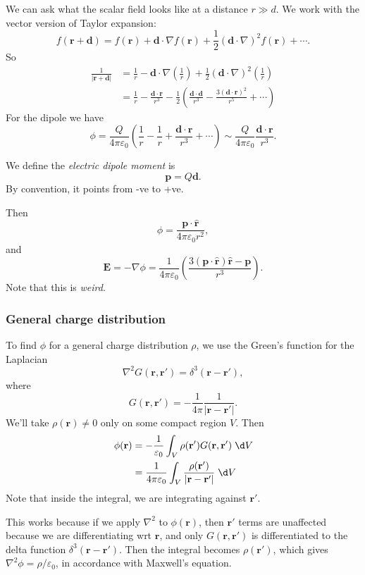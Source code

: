 \documentclass[a4paper]{article}
\begin{document}
We can ask what the scalar field looks like at a distance $r \gg d$. We work with the vector version of Taylor expansion:
\[
  f(\mathbf{r} + \mathbf{d}) = f(\mathbf{r}) + \mathbf{d}\cdot \nabla f(\mathbf{r}) + \frac{1}{2}(\mathbf{d}\cdot \nabla)^2f(\mathbf{r}) + \cdots.
\]
So
\begin{align*}
  \frac{1}{|\mathbf{r} + \mathbf{d}|} &= \frac{1}{r} - \mathbf{d}\cdot \nabla\left(\frac{1}{r}\right) + \frac{1}{2}(\mathbf{d}\cdot \nabla)^2\left(\frac{1}{r}\right)\\
  &= \frac{1}{r} - \frac{\mathbf{d}\cdot \mathbf{r}}{r^3} - \frac{1}{2}\left(\frac{\mathbf{d}\cdot \mathbf{d}}{r^3} - \frac{3(\mathbf{d}\cdot \mathbf{r})^2}{r^5} + \cdots\right)
\end{align*}
For the dipole we have
\[
  \phi = \frac{Q}{4\pi\varepsilon_0}\left(\frac{1}{r} - \frac{1}{r} + \frac{\mathbf{d}\cdot \mathbf{r}}{r^3} + \cdots\right) \sim \frac{Q}{4\pi\varepsilon_0} \frac{\mathbf{d}\cdot \mathbf{r}}{r^3}.
\]
\begin{defi}
  We define the \emph{electric dipole moment} is
  \[
    \mathbf{p} = Q\mathbf{d}.
  \]
  By convention, it points from -ve to +ve.
\end{defi}
Then
\[
  \phi = \frac{\mathbf{p}\cdot \hat{\mathbf{r}}}{4\pi\varepsilon_0 r^2},
\]
and
\[
  \mathbf{E} = -\nabla\phi = \frac{1}{4\pi\varepsilon_0}\left(\frac{3(\mathbf{p}\cdot\hat{\mathbf{r}})\hat{\mathbf{r}} - \mathbf{p}}{r^3}\right).
\]
Note that this is \emph{weird}.

\subsubsection{General charge distribution}
To find $\phi$ for a general charge distribution $\rho$, we use the Green's function for the Laplacian
\[
  \nabla^2 G(\mathbf{r}, \mathbf{r}') = \delta^3(\mathbf{r} - \mathbf{r}'),
\]
where
\[
  G(\mathbf{r}, \mathbf{r}') = -\frac{1}{4\pi}\frac{1}{|\mathbf{r} - \mathbf{r}'|}.
\]
We'll take $\rho(\mathbf{r})\not= 0$ only on some compact region $V$. Then
\begin{align*}
  \phi(\mathbf{r}) &= -\frac{1}{\varepsilon_0}\int_V \rho(\mathbf{r}') G(\mathbf{r}, \mathbf{r}')\;\d V\\
  &= \frac{1}{4\pi\varepsilon_0}\int_V \frac{\rho(\mathbf{r}')}{|\mathbf{r} - \mathbf{r}'|}\;\d V
\end{align*}
Note that inside the integral, we are integrating against $\mathbf{r}'$.

This works because if we apply $\nabla^2$ to $\phi(\mathbf{r})$, then $\mathbf{r}'$ terms are unaffected because we are differentiating wrt $\mathbf{r}$, and only $G(\mathbf{r}, \mathbf{r}')$ is differentiated to the delta function $\delta^3(\mathbf{r} - \mathbf{r}')$. Then the integral becomes $\rho(\mathbf{r}')$, which gives $\nabla^2 \phi = \rho/\varepsilon_0$, in accordance with Maxwell's equation.
\end{document}
